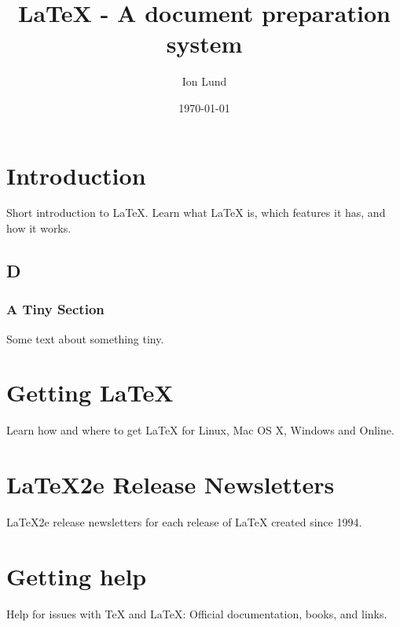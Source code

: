 \documentclass[12pt]{article}
\title{LaTeX - A document preparation system}
\author{Ion Lund}
\date{\today}
\begin{document}
\maketitle
\section{Introduction}
	Short introduction to LaTeX. Learn what LaTeX is, which features it has, and how it works.

\subsection{D}

\subsubsection{A Tiny Section}
	Some text about something tiny.

\section{Getting LaTeX}
	Learn how and where to get LaTeX for Linux, Mac OS X, Windows and Online.

\section{LaTeX2e Release Newsletters}
	LaTeX2e release newsletters for each release of LaTeX created since 1994.

\section{Getting help}
	Help for issues with TeX and LaTeX: Official documentation, books, and links.
\end{document}

